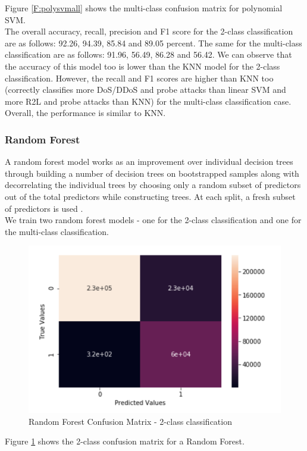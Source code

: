 Figure \ref{F:polysvmall} shows the multi-class confusion matrix for polynomial SVM.\\
The overall accuracy, recall, precision and F1 score for the 2-class classification are as follows: 92.26, 94.39, 85.84 and 89.05 percent. The same for the multi-class classification are as follows: 91.96, 56.49, 86.28
and 56.42. We can observe that the accuracy of this model too is lower than the KNN model for the 2-class classification. However, the recall and F1 scores are higher than KNN too (correctly classifies more DoS/DDoS and probe attacks than linear SVM and more R2L and probe attacks than KNN) for the multi-class classification case. Overall, the performance is similar to KNN.

\subsubsection{Random Forest}
A random forest model works as an improvement over individual decision trees through building a number of decision trees on bootstrapped samples along with decorrelating the individual trees by choosing only a random subset of predictors out of the total predictors while constructing trees. At each split, a fresh subset of predictors is used \cite{islr09}.\\
We train two random forest models - one for the 2-class classification and one for the multi-class classification. 
\begin{figure}
	\includegraphics[width=1.0\columnwidth]{images/rf2.PNG}
	\caption{Random Forest Confusion Matrix - 2-class classification}
	\label{F:rf2}
\end{figure}
Figure \ref{F:rf2} shows the 2-class confusion matrix for a Random Forest.
